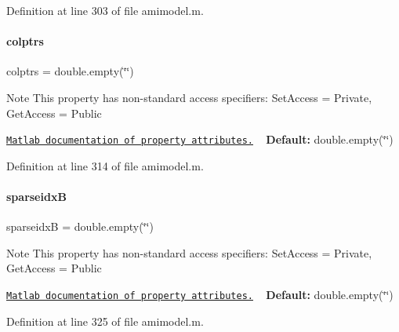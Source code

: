 Definition at line 303 of file amimodel.\+m.

\mbox{\label{classamimodel_a887e8a11654afa197d040d8bb10cbb38}} 
\paragraph{\texorpdfstring{colptrs}{colptrs}}
{\footnotesize\ttfamily colptrs = double.\+empty(\char`\"{}\char`\"{})}

\begin{DoxyNote}{Note}
This property has non-\/standard access specifiers\+: {\ttfamily Set\+Access = Private, Get\+Access = Public} 

\href{http://www.mathworks.com/help/matlab/matlab_oop/property-attributes.html}{\tt Matlab documentation of property attributes.} ~\newline
{\bfseries Default\+:} double.\+empty(\char`\"{}\char`\"{}) 
\end{DoxyNote}


Definition at line 314 of file amimodel.\+m.

\mbox{\label{classamimodel_adcfae93a688a66f1954d0832f51e4cc0}} 
\paragraph{\texorpdfstring{sparseidxB}{sparseidxB}}
{\footnotesize\ttfamily sparseidxB = double.\+empty(\char`\"{}\char`\"{})}

\begin{DoxyNote}{Note}
This property has non-\/standard access specifiers\+: {\ttfamily Set\+Access = Private, Get\+Access = Public} 

\href{http://www.mathworks.com/help/matlab/matlab_oop/property-attributes.html}{\tt Matlab documentation of property attributes.} ~\newline
{\bfseries Default\+:} double.\+empty(\char`\"{}\char`\"{}) 
\end{DoxyNote}


Definition at line 325 of file amimodel.\+m.

\mbox{\label{classamimodel_a1ba81ee0e28fe7c7576911973c82be70}} 
